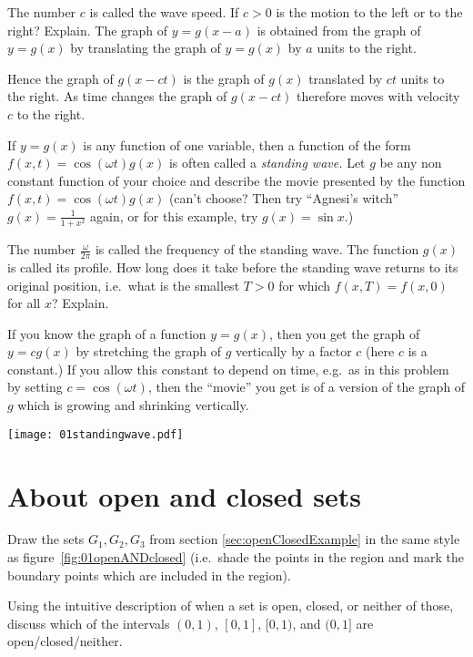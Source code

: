 The number $c$ is called the wave speed.  If $c>0$ is the motion to
the left or to the right? Explain.
\answer
The graph of $y=g(x-a)$ is obtained from the graph of $y=g(x)$ by
translating the graph of $y=g(x)$ by $a$ units to the right.

Hence the graph of $g(x-ct)$ is the graph of $g(x)$ translated by $ct$
units to the right.  As time changes the graph of $g(x-ct)$ therefore
moves with velocity $c$ to the right.
\endanswer


\problem If $y=g(x)$ is any function of one variable, then a function
of the form $f(x, t) = \cos(\omega t) g(x)$ is often called a
\emph{standing wave.}
Let $g$ be any non constant function of your choice and describe the
movie presented by the function $f(x, t) = \cos(\omega t)g(x)$
(can't choose?  Then try ``Agnesi's witch''  $g(x) = \frac{1}{1+x^2}$
again, or for this example, try $g(x) = \sin x$.)

The number $\frac\omega{2\pi}$ is called the frequency of the standing
wave.  The function $g(x)$ is called its profile.  How long does it
take before the standing wave returns to its original position, i.e.\
what is the smallest $T>0$ for which $f(x, T) = f(x, 0)$ for all $x$?
Explain.

\answer
If you know the graph of a function $y=g(x)$, then you get
the graph of $y=cg(x)$ by stretching the graph of $g$ vertically by
a factor $c$ (here $c$ is a constant.)
If you allow this constant to depend on time, e.g.\ as in this
problem by setting $c=\cos(\omega t)$, then the ``movie'' you get is of a
version of the graph of $g$ which is growing and shrinking vertically.

\begin{center}
    \texttt{[image: 01standingwave.pdf]}
\end{center}
\endanswer


\section*{About open and closed sets} %

\problem Draw the sets $G_1, G_2, G_3$ from section
\ref{sec:openClosedExample} in the same style as
figure~\ref{fig:01openANDclosed} (i.e.\ shade the points in the region
and mark the boundary points which are included in the region).

\problem Using the intuitive description of when a set is open,
closed, or neither of those, discuss which of the intervals $(0,1)$,
$[0,1]$, $[0,1)$, and $(0,1]$ are open/closed/neither.

